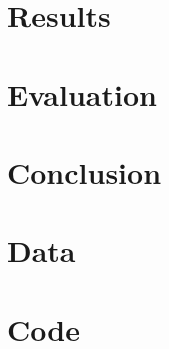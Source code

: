 \documentclass[a4paper, 12pt]{article}
\begin{document}
\section{Results}

\section{Evaluation}

\section{Conclusion}

\clearpage
\printbibliography                      %

\clearpage
\appendix
\appendixpage                           %
\addappheadtotoc                        %

\section{Data}

\section{Code}
\end{document}
